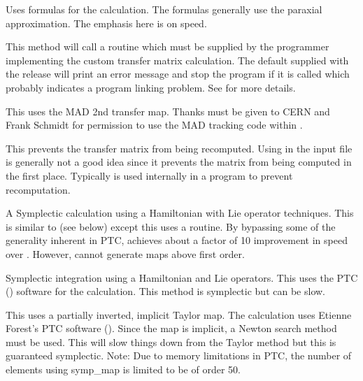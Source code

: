\begin{description}

\item[\vn{Bmad_Standard}]
Uses formulas for the calculation. The formulas generally use the
paraxial approximation. The emphasis here is on speed.

\item[\vn{Custom}]
This method will call a routine  which must be
supplied by the programmer implementing the custom transfer matrix
calculation. The default  supplied with the
\bmad release will print an error message and stop the program if it
is called which probably indicates a program linking problem.
See  for more details.

\item[\vn{MAD}]
This uses the MAD 2nd transfer map. Thanks must be given
to CERN and Frank Schmidt for permission to use the MAD tracking code
within \bmad.

\item[\vn{Static}]
This prevents the transfer matrix from being recomputed.
Using  in the input file is generally not a good idea since
it prevents the matrix from being computed in the first place.
Typically  is used internally in a program to prevent recomputation.

\item[\vn{Symp_Lie_Bmad}]
A Symplectic calculation using a Hamiltonian with Lie operator
techniques.  This is similar to  (see below) except
this uses a \bmad routine. By bypassing some of the generality
inherent in PTC,  achieves about a factor
of 10 improvement in speed over . However,
 cannot generate maps above first order.

\item[\vn{Symp_Lie_PTC}]
Symplectic integration using a Hamiltonian and Lie operators.
This uses the PTC () software for the calculation.
This method is symplectic but can be slow.

\item[\vn{Symp_Map}]
This uses a partially inverted, implicit Taylor map. The calculation
uses Etienne Forest's PTC software ().  Since the map is implicit, a Newton
search method must be used. This will slow things down from the Taylor
method but this is guaranteed symplectic. Note: Due to memory limitations
in PTC, the number of elements using symp_map is limited to be of order 50.


\end{description}
